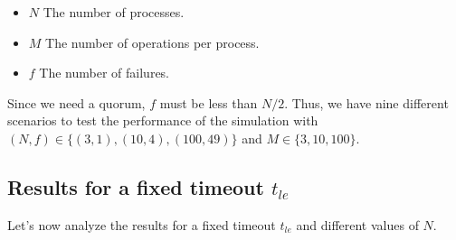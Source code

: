 \begin{itemize}
    \item $N$ The number of processes.
    \item $M$ The number of operations per process.
    \item $f$ The number of failures.
\end{itemize}

Since we need a quorum, $f$ must be less than $N/2$. Thus,
we have nine different scenarios to test the performance of the simulation
with $(N,f) \in \{(3,1),(10,4),(100,49)\}$ and $M \in \{3,10,100\}$.

\subsection{Results for a fixed timeout $t_{le}$}
Let's now analyze the results for a fixed timeout $t_{le}$ and different values of $N$.

